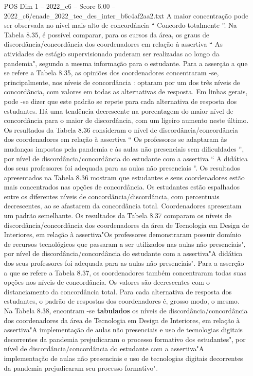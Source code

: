 \begin{textsample}{POS Dim 1 – 2022\_c6 – Score 6.00 – 2022\_c6/enade\_2022\_tec\_des\_inter\_b6c4af2aa2.txt}
A maior concentração pode ser observada no nível mais alto de concordância “ Concordo totalmente ”.
Na Tabela 8.35, é possível comparar, para os cursos da área, os graus de discordância/concordância dos coordenadores em relação à assertiva “ As atividades de estágio supervisionado puderam ser realizadas ao longo da pandemia", segundo a mesma informação para o estudante.
Para a asserção a que se refere a Tabela 8.35, as opiniões dos coordenadores concentraram -se, principalmente, nos níveis de concordância : optaram por um dos três níveis de concordância, com valores em todas as alternativas de resposta.
Em linhas gerais, pode -se dizer que este padrão se repete para cada alternativa de resposta dos estudantes.
Há uma tendência decrescente na porcentagem do maior nível de concordância para o maior de discordância, com um ligeiro aumento neste último.
Os resultados da Tabela 8.36 consideram o nível de discordância/concordância dos coordenadores em relação à assertiva “ Os professores se adaptaram às mudanças impostas pela pandemia e às aulas não presenciais sem dificuldades ”, por nível de discordância/concordância do estudante com a assertiva “ A didática dos seus professores foi adequada para as aulas não presenciais ”.
Os resultados apresentados na Tabela 8.36 mostram que estudantes e seus coordenadores estão mais concentrados nas opções de concordância.
Os estudantes estão espalhados entre os diferentes níveis de concordância/discordância, com percentuais decrescentes, ao se afastarem da concordância total.
Coordenadores apresentam um padrão semelhante.
Os resultados da Tabela 8.37 comparam os níveis de discordância/concordância dos coordenadores da área de Tecnologia em Design de Interiores, em relação à assertiva"Os professores demonstraram possuir domínio de recursos tecnológicos que passaram a ser utilizados nas aulas não presenciais", por nível de discordância/concordância do estudante com a assertiva"A didática dos seus professores foi adequada para as aulas não presenciais".
Para a asserção a que se refere a Tabela 8.37, os coordenadores também concentraram todas suas opções nos níveis de concordância.
Os valores são decrescentes com o distanciamento da concordância total.
Para cada alternativa de resposta dos estudantes, o padrão de respostas dos coordenadores é, grosso modo, o mesmo.
Na Tabela 8.38, encontram -se \textbf{tabulados} os níveis de discordância/concordância dos coordenadores da área de Tecnologia em Design de Interiores, em relação à assertiva"A implementação de aulas não presenciais e uso de tecnologias digitais decorrentes da pandemia prejudicaram o processo formativo dos estudantes", por nível de discordância/concordância do estudante com a assertiva"A implementação de aulas não presenciais e uso de tecnologias digitais decorrentes da pandemia prejudicaram seu processo formativo".

\end{textsample}
